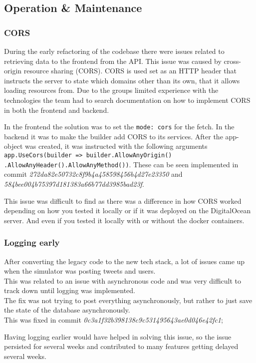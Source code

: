 \subsection{Operation \& Maintenance}
\subsubsection{CORS}
During the early refactoring of the codebase there were issues related to retrieving data to the frontend from the API. This issue was caused by cross-origin resource sharing (CORS). CORS is used set as an HTTP header that instructs the server to state which domains other than its own, that it allows loading resources from. Due to the groups limited experience with the technologies the team had to search documentation on how to implement CORS in both the frontend and backend.

In the frontend the solution was to set the \verb|mode: cors| for the fetch. In the backend it was to make the builder add CORS to its services. After the app-object was created, it was instructed with the following arguments \verb|app.UseCors(builder => builder.AllowAnyOrigin()|\\
\verb|.AllowAnyHeader().AllowAnyMethod())|. These can be seen implemented in commit \textit{272da82e50732c8f9b4a458598456b4d27e23350} and \\\textit{584bee004b75397d181383a66b77dd3985bad23f}.

This issue was difficult to find as there was a difference in how CORS worked depending on how you tested it locally or if it was deployed on the DigitalOcean server. And even if you tested it locally with or without the docker containers.

\subsubsection{Logging early}
After converting the legacy code to the new tech stack, a lot of issues came up when the simulator was posting tweets and users.\\
This was related to an issue with asynchronous code and was very difficult to track down until logging was implemented.\\
The fix was not trying to post everything asynchronously, but rather to just save the state of the database asynchronously.\\
This was fixed in commit \textit{0c3a1f32b398138c9c531495643ae0d046e42fc1};

Having logging earlier would have helped in solving this issue, so the issue persisted for several weeks and contributed to many features getting delayed several weeks.

